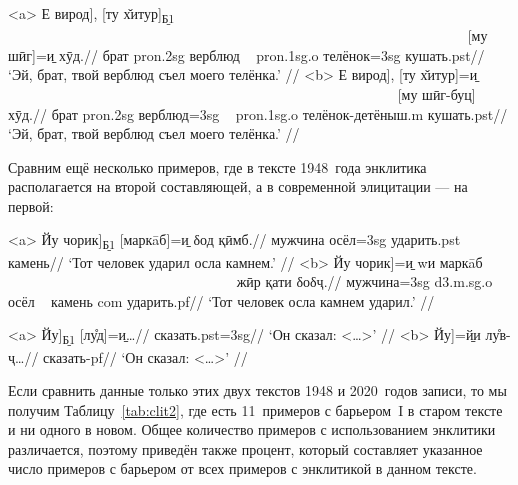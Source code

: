 \a<a> \begingl
\gla {[}Е вирод{]}, {[}ту х̌итур{]}\textsubscript{\b{Б1}} ~~~~~~~~~~~~~~~~~~~~~~~~~~~~~~~~~~~~~~~~~~~~~~~~~~~~~~~~~~~~~~~~~ {[}му шӣг{]}=\b{и} хӯд.//
 брат {\sc pron.2sg} верблюд ~ {\sc pron.1sg.o} телёнок={\sc 3sg} кушать.{\sc pst}//
\glft ‘Эй, брат, твой верблюд съел моего телёнка.’ //
\endgl
\a<b> \begingl
\gla {[}Е вирод{]}, {[}ту х̌итур{]}=\b{и} ~~~~~~~~~~~~~~~~~~~~~~~~~~~~~~~~~~~~~~~~~~~~~~~~~~~~~~~ {[}му шӣг-буц{]} хӯд.//
 брат {\sc pron.2sg} верблюд={\sc 3sg} ~ {\sc pron.1sg.o} телёнок-детёныш.{\sc m} кушать.{\sc pst}//
\glft ‘Эй, брат, твой верблюд съел моего телёнка.’ \trailingcitation{[элицитация, 2020]}//
\endgl \xe

Сравним ещё несколько примеров, где в тексте 1948~года энклитика располагается на второй составляющей, а в современной элицитации — на первой:

\a<a> \begingl
\gla {[}Йу чорик{]}\textsubscript{\b{Б1}} {[}маркāб{]}=\b{и} δод қӣмб.//
 мужчина осёл={\sc 3sg} ударить.{\sc pst} камень//
\glft ‘Тот человек ударил осла камнем.’ //
\endgl
\a<b> \begingl
\gla {[}Йу чорик{]}=\b{и} wи маркāб ~~~~~~~~~~~~~~~~~~~~~~~~~~~~~~~~ жӣр қати δоδҷ.//
 мужчина={\sc 3sg} {\sc d3.m.sg.o} осёл ~ камень {\sc com} ударить.{\sc pf}//
\glft ‘Тот человек осла камнем ударил.’ \trailingcitation{[элицитация, 2020]}//
\endgl \xe

\a<a> \begingl
\gla {[}Йу{]}\textsubscript{\b{Б1}} {[}лу̊д{]}=\b{и}…//
 сказать.{\sc pst=3sg}//
\glft ‘Он сказал: <…>’ //
\endgl
\a<b> \begingl
\gla {[}Йу{]}=\b{йи} лу̊в-ҷ…//
 сказать-{\sc pf}//
\glft ‘Он сказал: <…>’ \trailingcitation{[элицитация, 2020]}//
\endgl \xe

Если сравнить данные только этих двух текстов 1948 и 2020~годов записи, то мы получим Таблицу~\ref{tab:clit2}, где есть 11~примеров с барьером~I в старом тексте и ни одного в новом. Общее количество примеров с использованием энклитики различается, поэтому приведён также процент, который составляет указанное число примеров с барьером от всех примеров с энклитикой в данном тексте.

